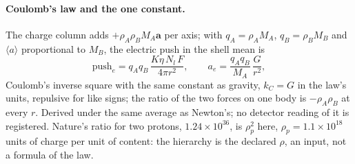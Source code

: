 \paragraph{Coulomb's law and the one constant.} The charge column adds $+\rho_A\rho_B M_A \mathbf a$ per axis; with $q_A = \rho_A M_A$, $q_B = \rho_B M_B$ and $\langle a\rangle$ proportional to $M_B$, the electric push in the shell mean is
\begin{equation}\label{eq:coulomb}
\mathrm{push}_e = q_A q_B\,\frac{K\eta\,N_l\,F}{4\pi r^2}, \qquad a_e = \frac{q_A q_B}{M_A}\,\frac{G}{r^2},
\end{equation}
Coulomb's inverse square with the same constant as gravity, $k_C = G$ in the law's units, repulsive for like signs; the ratio of the two forces on one body is $-\rho_A\rho_B$ at every $r$. Derived under the same average as Newton's; no detector reading of it is registered. Nature's ratio for two protons, $1.24 \times 10^{36}$, is $\rho_p^2$ here, $\rho_p = 1.1 \times 10^{18}$ units of charge per unit of content: the hierarchy is the declared $\rho$, an input, not a formula of the law.

